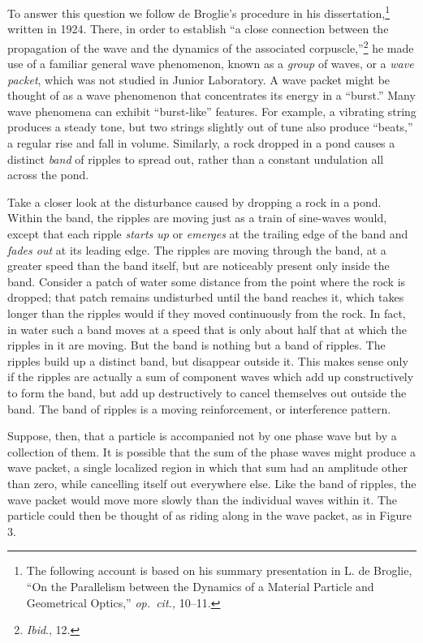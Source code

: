To answer this question we follow de Broglie's procedure in his
dissertation,\footnote{The following account is based on his summary
  presentation in L. de Broglie, ``On the Parallelism between the
  Dynamics of a Material Particle and Geometrical Optics,'' \emph{op.\
  cit.,} 10--11.} written in 1924. There, in order to establish ``a close
connection between the propagation of the wave and the dynamics of the
associated corpuscle,''\footnote{\emph{Ibid}., 12.} he made use of a
familiar general wave phenomenon, known as a \emph{group} of waves, or a
\emph{wave packet}, which was not studied in Junior Laboratory. A wave
packet might be thought of as a wave phenomenon that concentrates its
energy in a ``burst.'' Many wave phenomena can exhibit ``burst-like''
features. For example, a vibrating string produces a steady tone, but
two strings slightly out of tune also produce ``beats,'' a regular rise
and fall in volume. Similarly, a rock dropped in a pond causes a
distinct \emph{band} of ripples to spread out, rather than a constant
undulation all across the pond.

Take a closer look at the disturbance caused by dropping a rock in a
pond. Within the band, the ripples are moving
just as a train of sine-waves would, except that each ripple
\emph{starts up} or \emph{emerges} at the trailing edge of the
band and \emph{fades out} at its leading edge. The ripples are moving
through the band, at a greater speed than the band itself, but are
noticeably present only inside the band. Consider a patch of water some
distance from the point where the rock is dropped; that patch remains
undisturbed until the band reaches it, which takes longer than the
ripples would if they moved continuously from the rock. In fact, in
water such a band moves at a speed that is only about half that at which
the ripples in it are moving. But the band is nothing but a band of
ripples. The ripples build up a distinct band, but disappear outside it.
This makes sense only if the ripples are actually a sum of component
waves which add up constructively to form the band, but add up
destructively to cancel themselves out outside the band. The band of
ripples is a moving reinforcement, or interference pattern.

Suppose, then, that a particle is accompanied not by one phase wave but
by a collection of them. It is possible that the sum of the phase waves
might produce a wave packet, a single localized region in which that sum
had an amplitude other than zero, while cancelling itself out everywhere
else. Like the band of ripples, the wave packet would move more slowly
than the individual waves within it. The particle could then be thought
of as riding along in the wave packet, as in Figure 3.


